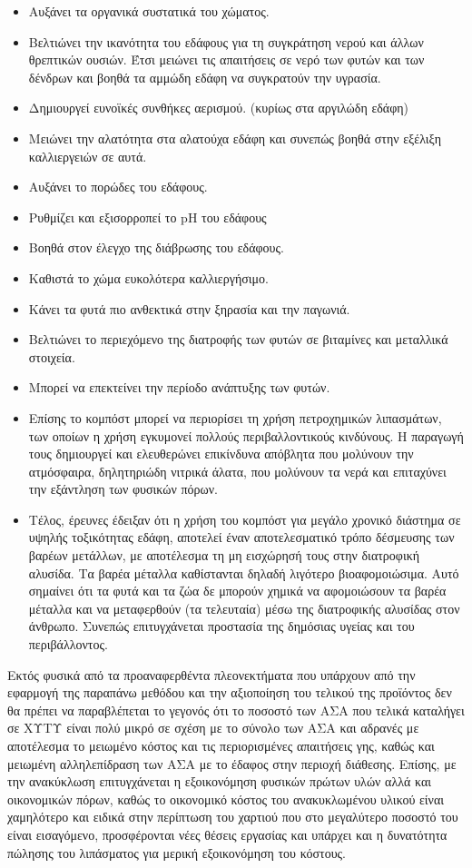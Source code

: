 \documentclass[12pt]{article}
\begin{document}
 	\begin{itemize}
 		\item Αυξάνει τα οργανικά συστατικά του χώματος.
 		\item Βελτιώνει την ικανότητα του εδάφους για τη συγκράτηση νερού και άλλων θρεπτικών ουσιών. Έτσι μειώνει τις απαιτήσεις σε νερό των φυτών και των δένδρων και βοηθά τα αμμώδη εδάφη να συγκρατούν την υγρασία. 
 		\item Δημιουργεί ευνοϊκές συνθήκες αερισμού. (κυρίως στα αργιλώδη εδάφη)
 		\item Μειώνει την αλατότητα στα αλατούχα εδάφη και συνεπώς βοηθά στην εξέλιξη καλλιεργειών σε αυτά. 
 		\item Αυξάνει το πορώδες του εδάφους. 
 		\item Ρυθμίζει και εξισορροπεί το pΗ του εδάφους
 		\item Βοηθά στον έλεγχο της διάβρωσης του εδάφους. 
 		\item Καθιστά το χώμα ευκολότερα καλλιεργήσιμο. 
 		\item Κάνει τα φυτά πιο ανθεκτικά στην ξηρασία και την παγωνιά.
 		\item Βελτιώνει το περιεχόμενο της διατροφής των φυτών σε βιταμίνες και μεταλλικά στοιχεία. 
 		\item Μπορεί να επεκτείνει την περίοδο ανάπτυξης των φυτών. 
 		\item Επίσης το κομπόστ μπορεί να περιορίσει τη χρήση πετροχημικών λιπασμάτων, των οποίων η χρήση εγκυμονεί πολλούς περιβαλλοντικούς κινδύνους. Η παραγωγή τους δημιουργεί και ελευθερώνει επικίνδυνα απόβλητα που μολύνουν την ατμόσφαιρα, δηλητηριώδη νιτρικά άλατα, που μολύνουν τα νερά και επιταχύνει την εξάντληση των φυσικών πόρων. 
 		\item Τέλος, έρευνες έδειξαν ότι η χρήση του κομπόστ για μεγάλο χρονικό διάστημα σε υψηλής τοξικότητας εδάφη, αποτελεί έναν αποτελεσματικό τρόπο δέσμευσης των βαρέων μετάλλων, με αποτέλεσμα τη μη εισχώρησή τους στην διατροφική αλυσίδα. Τα βαρέα μέταλλα καθίστανται δηλαδή λιγότερο βιοαφομοιώσιμα. Αυτό σημαίνει ότι τα φυτά και τα ζώα δε μπορούν χημικά να αφομοιώσουν τα βαρέα μέταλλα και να μεταφερθούν (τα τελευταία) μέσω της διατροφικής αλυσίδας στον άνθρωπο. Συνεπώς επιτυγχάνεται προστασία της δημόσιας υγείας και του περιβάλλοντος.
 	\end{itemize}
 
 	Εκτός φυσικά από τα προαναφερθέντα πλεονεκτήματα που υπάρχουν από την εφαρμογή της παραπάνω μεθόδου και την αξιοποίηση του τελικού της προϊόντος δεν θα πρέπει να παραβλέπεται το γεγονός ότι το ποσοστό των ΑΣΑ που τελικά καταλήγει σε ΧΥΤΥ είναι πολύ μικρό σε σχέση με το σύνολο των ΑΣΑ και αδρανές με αποτέλεσμα το μειωμένο κόστος και τις περιορισμένες απαιτήσεις γης, καθώς και μειωμένη αλληλεπίδραση των ΑΣΑ με το έδαφος στην περιοχή διάθεσης. Επίσης, με την ανακύκλωση επιτυγχάνεται η εξοικονόμηση φυσικών πρώτων υλών αλλά και οικονομικών πόρων, καθώς το οικονομικό κόστος του ανακυκλωμένου υλικού είναι χαμηλότερο και ειδικά στην περίπτωση του χαρτιού που στο μεγαλύτερο ποσοστό του είναι εισαγόμενο, προσφέρονται νέες θέσεις εργασίας και υπάρχει και η δυνατότητα πώλησης του λιπάσματος για μερική εξοικονόμηση του κόστους.
 	
\end{document}
